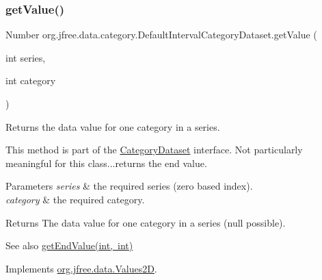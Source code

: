 \subsubsection{\texorpdfstring{get\+Value()}{getValue()}\hspace{0.1cm}{\footnotesize\ttfamily [2/2]}}
{\footnotesize\ttfamily Number org.\+jfree.\+data.\+category.\+Default\+Interval\+Category\+Dataset.\+get\+Value (\begin{DoxyParamCaption}\item[{int}]{series,  }\item[{int}]{category }\end{DoxyParamCaption})}

Returns the data value for one category in a series. 

This method is part of the \mbox{\hyperlink{interfaceorg_1_1jfree_1_1data_1_1category_1_1_category_dataset}{Category\+Dataset}} interface. Not particularly meaningful for this class...returns the end value.


\begin{DoxyParams}{Parameters}
{\em series} & the required series (zero based index). \\
\hline
{\em category} & the required category.\\
\hline
\end{DoxyParams}
\begin{DoxyReturn}{Returns}
The data value for one category in a series (null possible).
\end{DoxyReturn}
\begin{DoxySeeAlso}{See also}
\mbox{\hyperlink{classorg_1_1jfree_1_1data_1_1category_1_1_default_interval_category_dataset_a4b514652a603f11d569d6797bd0bbe61}{get\+End\+Value(int, int)}} 
\end{DoxySeeAlso}


Implements \mbox{\hyperlink{interfaceorg_1_1jfree_1_1data_1_1_values2_d_a0797937d3ac62e18b300eef1fe906ec6}{org.\+jfree.\+data.\+Values2D}}.

\mbox{\label{classorg_1_1jfree_1_1data_1_1category_1_1_default_interval_category_dataset_a14b094d927d4e3002f48c30123e72c5c}} 
